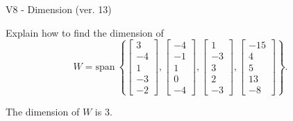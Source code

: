 \begin{exercise}
  \begin{exerciseTitle}V8 - Dimension (ver. 13)\end{exerciseTitle}
  \begin{exerciseStatement}
    Explain how to find the dimension of 
\[W=\mathrm{span}\ \left\{\left[\begin{array}{r}
3 \\
-4 \\
1 \\
-3 \\
-2
\end{array}\right] , \left[\begin{array}{r}
-4 \\
-1 \\
1 \\
0 \\
-4
\end{array}\right] , \left[\begin{array}{r}
1 \\
-3 \\
3 \\
2 \\
-3
\end{array}\right] , \left[\begin{array}{r}
-15 \\
4 \\
5 \\
13 \\
-8
\end{array}\right]\right\}.\]



  \end{exerciseStatement}
  \begin{exerciseAnswer}
   The dimension of \(W\) is  \(3\).
  


  \end{exerciseAnswer}
\end{exercise}